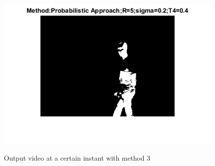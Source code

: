 \documentclass[11pt]{article}
\begin{document}
\begin{figure}[H]
	\centering
	{\includegraphics[width=12cm]{images/inst_3.png} }
    \caption{Output video at a certain instant with method 3}
    \label{fig:out3}
\end{figure}
\end{document}
